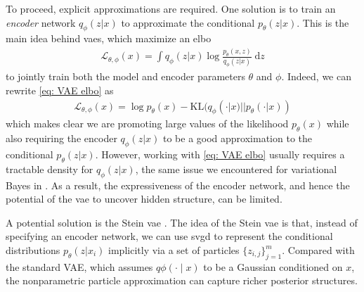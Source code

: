 \documentclass[12pt,paper=letter]{scrreprt}
\begin{document}
To proceed, explicit approximations are required.
One solution is to train an \emph{encoder} network $q_\phi(z|x)$ to approximate the conditional $p_\theta(z|x)$.
This is the main idea behind \acp{vae}, which maximize an \ac{elbo}
\begin{align}
    \mathcal{L}_{\theta,\phi}(x) = \int q_\phi(z|x) \log \frac{p_\theta(x,z)}{q_\phi(z|x)} \; \mathrm{d}z \label{eq: VAE elbo}
\end{align}
to jointly train both the model and encoder parameters $\theta$ and $\phi$. 
Indeed, we can rewrite \eqref{eq: VAE elbo} as
\begin{align*}
    \mathcal{L}_{\theta,\phi}(x) = \log p_\theta(x) - \mathrm{KL}(q_\phi(\cdot | x) || p_\theta(\cdot | x) )
\end{align*}
which makes clear we are promoting large values of the likelihood $p_\theta(x)$ while also requiring the encoder $q_\phi(z|x)$ to be a good approximation to the conditional $p_\theta(z|x)$.
However, working with \eqref{eq: VAE elbo} usually requires a tractable density for $q_\phi(z | x)$, the same issue we encountered for variational Bayes in .
As a result, the expressiveness of the encoder network, and hence the potential of the \ac{vae} to uncover hidden structure, can be limited.





A potential solution is the Stein \ac{vae} \citep{pu2017stein,feng2017learning}.
The idea of the Stein \ac{vae} is that, instead of specifying an encoder network, we can use \ac{svgd} to represent the conditional distributions $p_\theta(z|x_i)$ implicitly via a set of particles $\{z_{i,j}\}_{j=1}^m$.
Compared with the standard VAE, which assumes $q{\phi}(\cdot\mid x)$ to be a Gaussian conditioned on $x$, the nonparametric particle approximation can capture richer posterior structures. 
\end{document}
